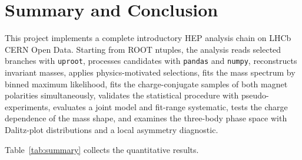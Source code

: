 \section{Summary and Conclusion}
\label{sec:conclusion}

This project implements a complete introductory HEP analysis chain on LHCb CERN
Open Data. Starting from ROOT ntuples, the analysis reads selected branches with
\texttt{uproot}, processes candidates with \texttt{pandas} and \texttt{numpy},
reconstructs invariant masses, applies physics-motivated selections, fits the
mass spectrum by binned maximum likelihood, fits the charge-conjugate samples of
both magnet polarities simultaneously, validates the statistical procedure with
pseudo-experiments, evaluates a joint model and fit-range systematic, tests the
charge dependence of the mass shape, and examines the three-body phase space
with Dalitz-plot distributions and a local asymmetry diagnostic.

Table~\ref{tab:summary} collects the quantitative results.

